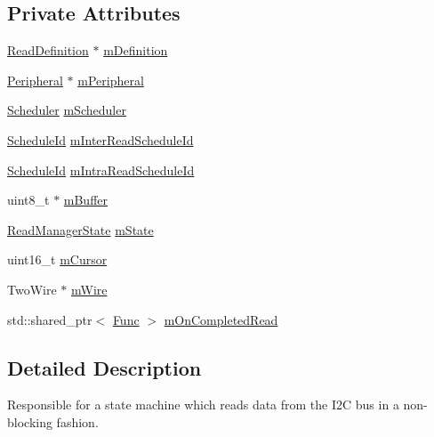 \subsection*{Private Attributes}
\begin{DoxyCompactItemize}
\item 
\mbox{\hyperlink{struct_read_definition}{Read\+Definition}} $\ast$ \mbox{\hyperlink{class_i2_c_read_manager_a9a3f55a2c1fed16d7e17b16c153f0b32}{m\+Definition}}
\item 
\mbox{\hyperlink{struct_peripheral}{Peripheral}} $\ast$ \mbox{\hyperlink{class_i2_c_read_manager_a013d5feaf3f4d648b7ee840bd600aaf6}{m\+Peripheral}}
\item 
\mbox{\hyperlink{class_scheduler}{Scheduler}} \mbox{\hyperlink{class_i2_c_read_manager_a948854518d1720e57ce3980308e47f23}{m\+Scheduler}}
\item 
\mbox{\hyperlink{_scheduler_8h_a1e3b4605bdcbb8f6df7c47013e26e910}{Schedule\+Id}} \mbox{\hyperlink{class_i2_c_read_manager_abdf4bf35894f1b91f8af92b2de6ef709}{m\+Inter\+Read\+Schedule\+Id}}
\item 
\mbox{\hyperlink{_scheduler_8h_a1e3b4605bdcbb8f6df7c47013e26e910}{Schedule\+Id}} \mbox{\hyperlink{class_i2_c_read_manager_ad8505529aa2361af0e89087f679b0f80}{m\+Intra\+Read\+Schedule\+Id}}
\item 
uint8\+\_\+t $\ast$ \mbox{\hyperlink{class_i2_c_read_manager_af4df317c2ac86fa929f85c96b5d9a56b}{m\+Buffer}}
\item 
\mbox{\hyperlink{_i2_c_read_manager_8h_a6fa8ade9cf010a4fd9f7a36c4a4566aa}{Read\+Manager\+State}} \mbox{\hyperlink{class_i2_c_read_manager_ad3377b1f52aceee0bd2aa4597521b20a}{m\+State}}
\item 
uint16\+\_\+t \mbox{\hyperlink{class_i2_c_read_manager_a38cc98d6047836aec409733a8591ce2e}{m\+Cursor}}
\item 
Two\+Wire $\ast$ \mbox{\hyperlink{class_i2_c_read_manager_ab030eaa59d0661eb7b980a0419236788}{m\+Wire}}
\item 
std\+::shared\+\_\+ptr$<$ \mbox{\hyperlink{_scheduler_8h_a2125a5a2949d6ee13163b671159c0d4d}{Func}} $>$ \mbox{\hyperlink{class_i2_c_read_manager_a60fc6315a6e4bb48341c095907a36941}{m\+On\+Completed\+Read}}
\end{DoxyCompactItemize}


\subsection{Detailed Description}
Responsible for a state machine which reads data from the I2C bus in a non-\/blocking fashion. 

